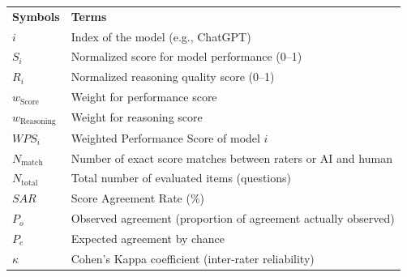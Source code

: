 %

\begin{tabular}{p{} l}
\textbf{Symbols} & \textbf{Terms}\\ 
  $i$ & Index of the model (e.g., ChatGPT) \\
  $S_i$ & Normalized score for model performance (0–1) \\
  $R_i$ & Normalized reasoning quality score (0–1) \\
  $w_{\text{Score}}$ & Weight for performance score \\
  $w_{\text{Reasoning}}$ & Weight for reasoning score \\
  $WPS_i$ & Weighted Performance Score of model $i$ \\ 
  $N_{\text{match}}$ & Number of exact score matches between raters or AI and human \\ 
  $N_{\text{total}}$ & Total number of evaluated items (questions) \\ 
  $SAR$ & Score Agreement Rate (\%) \\ 
  $P_o$ & Observed agreement (proportion of agreement actually observed) \\ 
  $P_e$ & Expected agreement by chance \\ 
  $\kappa$ & Cohen’s Kappa coefficient (inter-rater reliability) \\ 
\end{tabular}

\vspace{1em}

